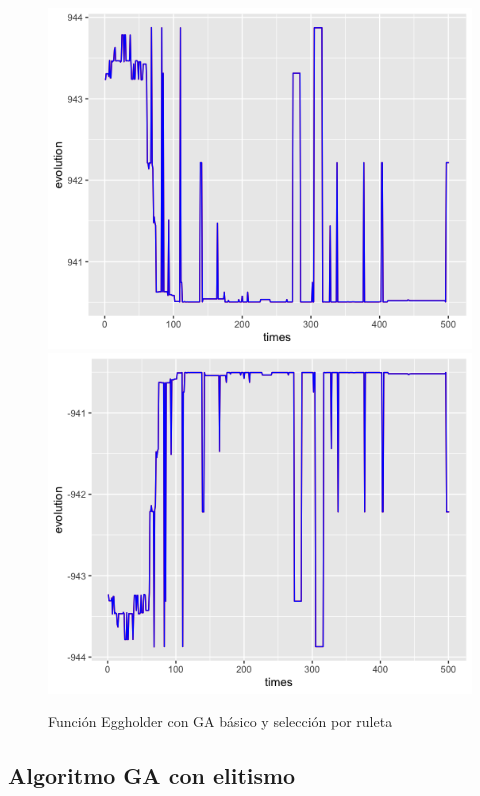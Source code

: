 \documentclass[letterpaper,12pt]{article}
\theoremstyle{definition}
\begin{document}
\begin{figure}[H]
    \includegraphics[width=\linewidth]{egg_basic_fitness}
  \endminipage\hfill
    \includegraphics[width=\linewidth]{egg_basic_eval}
  \endminipage\hfill
  \caption{Función Eggholder con GA básico y selección por ruleta}
  \label{fig:egg_basic}
\end{figure}


\subsection*{Algoritmo GA con elitismo}
\end{document}

